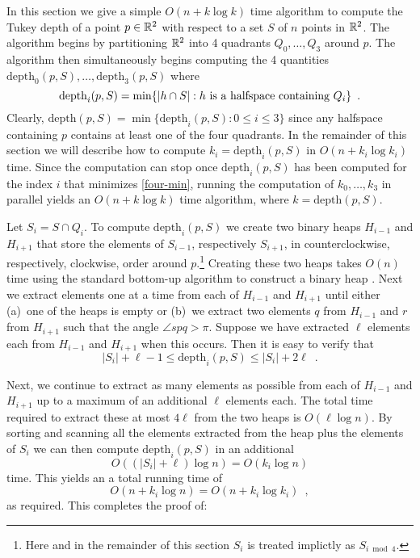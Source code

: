\documentclass[charterfonts,lotsofwhite]{patmorin}
\newcommand{\td}{\mathrm{depth}}
\begin{document}
In this section we give a simple $O(n + k\log k)$ time algorithm to
compute the Tukey depth of a point $p\in\mathbb{R}^2$ with respect to
a set $S$ of $n$ points in $\mathbb{R}^2$.  The algorithm begins by
partitioning $\mathbb{R}^2$ into 4 quadrants $Q_0,\ldots,Q_3$ around $p$.
The algorithm then simultaneously begins computing the 4 quantities
$\td_0(p,S),\ldots,\td_3(p,S)$ where 
\begin{equation}
     \td_i(p,S) = \min\{|h\cap S| : \mbox{$h$ is a halfspace containing
$Q_i$} \} \enspace . \eqlabel{four-min}
\end{equation}
Clearly, $\td(p,S) = \min\{\td_i(p,S): 0\le i \le 3 \}$ since any
halfspace containing $p$ contains at least one of the four quadrants.
In the remainder of this section we will describe how to compute
$k_i=\td_i(p,S)$ in $O(n + k_i\log k_i)$ time.  Since the
computation can stop once $\td_i(p,S)$ has been computed for
the index $i$ that minimizes \eqref{four-min}, running the computation
of $k_0,\ldots,k_3$ in parallel yields an $O(n +
k\log k)$ time algorithm, where $k=\td(p,S)$.

Let $S_i=S\cap Q_i$. To compute $\td_i(p,S)$ we create two binary
heaps $H_{i-1}$ and $H_{i+1}$ that store the elements of $S_{i-1}$,
respectively $S_{i+1}$, in counterclockwise, respectively, clockwise,
order around $p$.\footnote{Here and in the remainder of this section
$S_i$ is treated implictly as $S_{i\bmod 4}$.} 
Creating these two heaps takes $O(n)$ time using the
standard bottom-up algorithm to construct a binary heap
\cite[Chapter~6]{clrs01}.
Next we extract elements one at a time from each of $H_{i-1}$ and
$H_{i+1}$ until either (a)~one of the heaps is empty or (b)~we extract
two elements $q$ from $H_{i-1}$ and $r$ from $H_{i+1}$ such that the
angle $\angle spq > \pi$.  Suppose we have extracted $\ell$ elements
each from $H_{i-1}$ and $H_{i+1}$ when this occurs.  Then it is easy
to verify that 
\[  
  |S_i| + \ell - 1 \le \td_i(p,S) \le |S_i| + 2\ell \enspace .
\]

Next, we continue to extract as many elements as possible from each of
$H_{i-1}$ and $H_{i+1}$ up to a maximum of an additional $\ell$
elements each. The total time required to extract these at most
$4\ell$ from the two heaps is $O(\ell\log n)$.  By sorting and
scanning all the elements extracted from the heap plus the elements of
$S_i$ we can then compute $\td_i(p,S)$ in an additional
\[
     O((|S_i|+\ell)\log n) = O(k_i\log n)
\] 
time.  This yields an a total running time of 
\[  
   O(n + k_i\log n) = O(n + k_i\log k_i) \enspace ,
\]
as required.  This completes the proof of:
\end{document}
